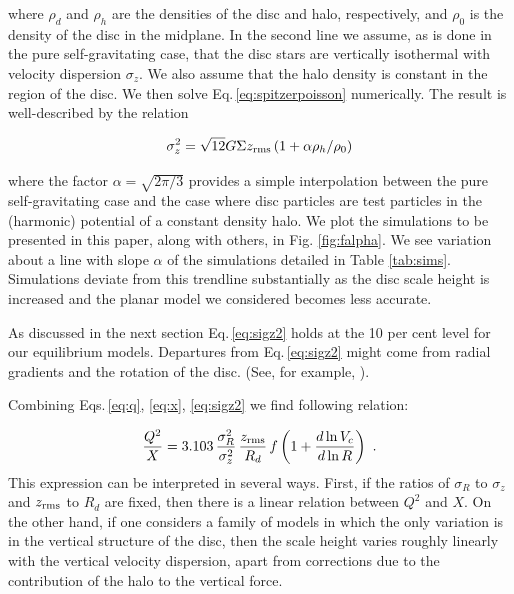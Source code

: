 \noindent where $\rho_d$ and $\rho_h$ are the densities of the disc
and halo, respectively, and $\rho_0$ is the density of the disc in the
midplane.  In the second line we assume, as is done in the pure
self-gravitating case, that the disc stars are vertically isothermal
with velocity dispersion $\sigma_z$.  We also assume that the halo
density is constant in the region of the disc.  We then solve
Eq.\,\ref{eq:spitzerpoisson} numerically.  The result is
well-described by the relation

\begin{equation}\label{eq:sigz2}
\sigma_z^2 = \sqrt{12} 
G\Sigma z_{\rm rms} \left (1 + \alpha\rho_h/\rho_0\right )
\end{equation}

\noindent where the factor $\alpha = \sqrt{2\pi/3}$ provides a
simple interpolation between the pure self-gravitating case and the
case where disc particles are test particles in the (harmonic)
potential of a constant density halo.  {We plot the simulations to 
be presented in this paper, along with others, in Fig. \ref{fig:falpha}.
We see variation about a line with slope $\alpha$ of the simulations
detailed in Table \ref{tab:sims}. Simulations deviate from this trendline
substantially as the disc scale height is increased and the planar model
we considered becomes less accurate.}

As discussed in the next
section Eq.\,\ref{eq:sigz2} holds at the 10 per cent level for our
equilibrium models.  Departures from Eq.\,\ref{eq:sigz2} might come
from radial gradients and the rotation of the disc. (See, for example,
\citet{read2014}).

Combining Eqs.\,\ref{eq:q}, \ref{eq:x}, \ref{eq:sigz2} we find 
following relation:

\begin{equation}\label{eq:r}
\frac{Q^2}{X} = 3.103 \,
\frac{\sigma_R^2}{\sigma_z^2} \,
\frac{z_{\rm rms}}{R_d}\,
f\left (1 + \frac{d\ln V_c}{d\ln R}\right )~.
\end{equation}
\noindent This expression can be interpreted in several ways.  First,
if the ratios of $\sigma_R$ to $\sigma_z$ and $z_{\rm rms}$ to $R_d$ are
fixed, then there is a linear relation between $Q^2$ and $X$.  On the
other hand, if one considers a family of models in which the only
variation is in the vertical structure of the disc, then the scale
height varies roughly linearly with the vertical velocity dispersion,
apart from corrections due to the contribution of the halo to the
vertical force.

